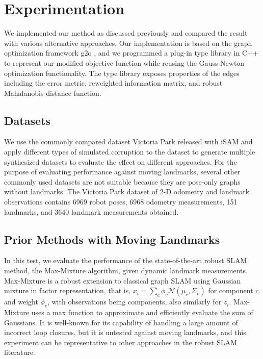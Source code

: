 \section{Experimentation}

We implemented our method as discussed previously and compared the result with
various alternative approaches. Our implementation is based on the graph
optimization framework g2o \cite{g2o}, and we programmed a plug-in type library
in C++ to represent our modified objective function while reusing the Gauss-Newton
optimization functionality. The type library exposes properties of the edges including
the error metric, reweighted information matrix, and robust Mahalanobis distance function.

\subsection{Datasets}

We use the commonly compared dataset Victoria Park released with iSAM
\cite{isam} and apply different types of simulated corruption to the dataset to
generate multiple synthesized datasets to evaluate the effect on different
approaches.  For the purpose of evaluating performance against moving
landmarks, several other commonly used datasets are not suitable because they
are pose-only graphs without landmarks. The Victoria Park dataset of 2-D
odometry and landmark observations contains 6969 robot poses, 6968 odometry
measurements, 151 landmarks, and 3640 landmark measurements obtained.

\subsection{Prior Methods with Moving Landmarks}

In this test, we evaluate the performance of the state-of-the-art robust
SLAM method, the Max-Mixture algorithm, given dynamic landmark measurements.
Max-Mixture is a robust extension to classical graph SLAM using Gaussian
mixture in factor representation, that is, $ x_i = \sum_c \phi_c
\mathcal{N}(\mu_c, \Sigma_c)$ for component $c$ and weight $\phi_c$, with
observations being components, also similarly for $z_i$. Max-Mixture uses a max
function to approximate and efficiently evaluate the sum of Gaussians. It is
well-known for its capability of handling a large amount of incorrect loop
closures, but it is untested against moving landmarks, and this experiment can
be representative to other approaches in the robust SLAM literature. 

